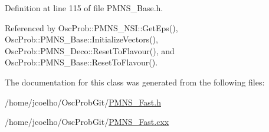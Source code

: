 Definition at line 115 of file P\+M\+N\+S\+\_\+\+Base.\+h.



Referenced by Osc\+Prob\+::\+P\+M\+N\+S\+\_\+\+N\+S\+I\+::\+Get\+Eps(), Osc\+Prob\+::\+P\+M\+N\+S\+\_\+\+Base\+::\+Initialize\+Vectors(), Osc\+Prob\+::\+P\+M\+N\+S\+\_\+\+Deco\+::\+Reset\+To\+Flavour(), and Osc\+Prob\+::\+P\+M\+N\+S\+\_\+\+Base\+::\+Reset\+To\+Flavour().



The documentation for this class was generated from the following files\+:\begin{DoxyCompactItemize}
\item 
/home/jcoelho/\+Osc\+Prob\+Git/\hyperlink{PMNS__Fast_8h}{P\+M\+N\+S\+\_\+\+Fast.\+h}\item 
/home/jcoelho/\+Osc\+Prob\+Git/\hyperlink{PMNS__Fast_8cxx}{P\+M\+N\+S\+\_\+\+Fast.\+cxx}\end{DoxyCompactItemize}
